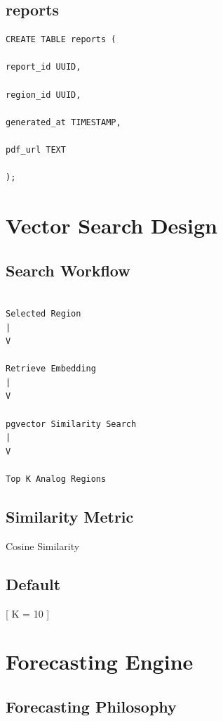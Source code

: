 \documentclass[11pt,a4paper]{article}
\begin{document}
\subsection{reports}

\begin{verbatim}
CREATE TABLE reports (

report_id UUID,

region_id UUID,

generated_at TIMESTAMP,

pdf_url TEXT

);
\end{verbatim}

\section{Vector Search Design}

\subsection{Search Workflow}

\begin{verbatim}

Selected Region
|
V

Retrieve Embedding
|
V

pgvector Similarity Search
|
V

Top K Analog Regions

\end{verbatim}

\subsection{Similarity Metric}

Cosine Similarity

\subsection{Default}

[
K = 10
]

\section{Forecasting Engine}

\subsection{Forecasting Philosophy}
\end{document}
